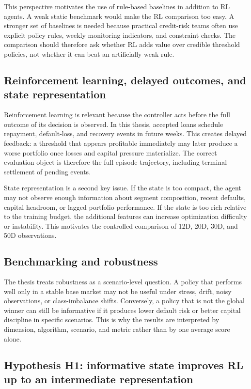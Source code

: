 \documentclass[12pt,a4paper]{article}
\begin{document}
This perspective motivates the use of rule-based baselines in addition to RL agents. A weak static benchmark would make the RL comparison too easy. A stronger set of baselines is needed because practical credit-risk teams often use explicit policy rules, weekly monitoring indicators, and constraint checks. The comparison should therefore ask whether RL adds value over credible threshold policies, not whether it can beat an artificially weak rule.

\subsection{Reinforcement learning, delayed outcomes, and state representation}

Reinforcement learning is relevant because the controller acts before the full outcome of its decision is observed. In this thesis, accepted loans schedule repayment, default-loss, and recovery events in future weeks. This creates delayed feedback: a threshold that appears profitable immediately may later produce a worse portfolio once losses and capital pressure materialize. The correct evaluation object is therefore the full episode trajectory, including terminal settlement of pending events.

State representation is a second key issue. If the state is too compact, the agent may not observe enough information about segment composition, recent defaults, capital headroom, or lagged portfolio performance. If the state is too rich relative to the training budget, the additional features can increase optimization difficulty or instability. This motivates the controlled comparison of 12D, 20D, 30D, and 50D observations.

\subsection{Benchmarking and robustness}

The thesis treats robustness as a scenario-level question. A policy that performs well only in a stable base market may not be useful under stress, drift, noisy observations, or class-imbalance shifts. Conversely, a policy that is not the global winner can still be informative if it produces lower default risk or better capital discipline in specific scenarios. This is why the results are interpreted by dimension, algorithm, scenario, and metric rather than by one average score alone.

\subsection{Hypothesis H1: informative state improves RL up to an intermediate representation}
\label{sec:hypotheses}
\end{document}
